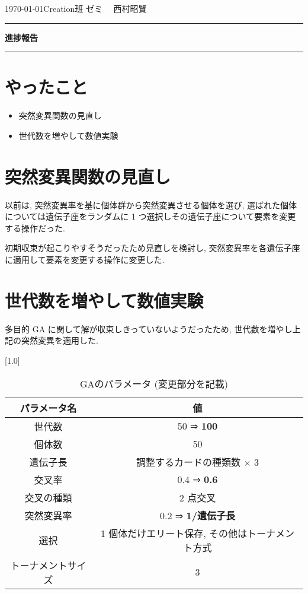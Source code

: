 \documentclass{jarticle}     %
\begin{document}
  \noindent
  \hspace{1em}

  \today Creation班 ゼミ
  \hfill
  \ \  西村昭賢 

  \vspace{2mm}
  \hrule
  \begin{center}
  {\Large \bf 進捗報告}
  \end{center}
  \hrule
  \vspace{3mm}


\section{やったこと}
\begin{itemize}
  \item 突然変異関数の見直し
  \item 世代数を増やして数値実験
\end{itemize}


\section{突然変異関数の見直し}
以前は, 突然変異率を基に個体群から突然変異させる個体を選び, 選ばれた個体については遺伝子座をランダムに 1 つ選択しその遺伝子座について要素を変更する操作だった. \par
初期収束が起こりやすそうだったため見直しを検討し, 突然変異率を各遺伝子座に適用して要素を変更する操作に変更した.



\section{世代数を増やして数値実験}
多目的 GA に関して解が収束しきっていないようだったため, 世代数を増やし上記の突然変異を適用した.


\begin{table}[ht]
  \centering
  \caption{GAのパラメータ (変更部分を記載)}
  \vspace{-0.3cm}
  \label{table:gaparam}
  \scalebox{1.0}[1.0]{
    \begin{tabular}{|c|c|}
      \hline
      パラメータ名 & 値 \\ \hline \hline
      世代数 & 50 ⇒ \textbf{100} \\ \hline     
      個体数 & 50     \\ \hline
      遺伝子長 & 調整するカードの種類数 $\times$ 3       \\ \hline
      交叉率 & 0.4 ⇒ \textbf{0.6} \\ \hline
      交叉の種類 & 2 点交叉 \\ \hline
      突然変異率 & 0.2 ⇒ \textbf{1/遺伝子長} \\ \hline
      選択 & 1 個体だけエリート保存, その他はトーナメント方式 \\ \hline
      トーナメントサイズ &  3 \\ \hline
      \end{tabular}
  }
  \end{table}
\end{document}
